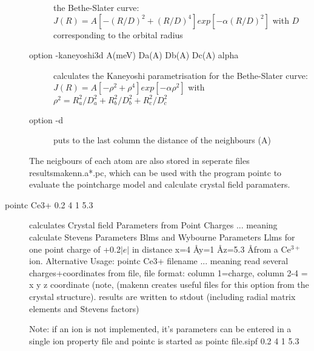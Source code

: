 \begin{description}
\begin{description}
the Bethe-Slater
                               curve: $J(R)= A [-(R/D)^2+(R/D)^4]exp[-\alpha (R/D)^2]$  with $D$ %
corresponding
                               to the orbital radius
\item[option {\prg -kaneyoshi3d A(meV) Da(A) Db(A) Dc(A) alpha}] calculates the Kaneyoshi %
parametrisation for the Bethe-Slater
                               curve: $J(R)= A [-\rho^2+\rho^4]exp[-\alpha \rho^2]$  with %
$\rho^2=R_a^2/D_a^2+R_b^2/D_b^2+R_c^2/D_c^2$
\item[option {\prg -d}] puts to the last column the distance of the neighbours (A)
\end{description}
The neigbours of each atom are also stored in seperate files
{\prg results\/makenn.a*.pc}, which can be used with the program {\prg pointc} to evaluate
the pointcharge model and calculate crystal field paramaters.

\item [\prg pointc\index{pointc} Ce3+ 0.2 4 1 5.3]
              calculates Crystal field Parameters from Point Charges  
                 ... meaning calculate Stevens Parameters Blms 
                                  and Wybourne Parameters Llms
                 for one point charge of +0.2$|e|$ in distance
                 x=4 \AA y=1 \AA z=5.3 \AA from a Ce$^{3+}$ ion.
                Alternative Usage: pointc Ce3+ filename
                 ... meaning read several charges+coordinates from file,
                 file format: column 1=charge, column 2-4 = x y z coordinate  (note,
				 ({\prg makenn} creates useful files for this option from the crystal %
structure).
                results are written to stdout (including radial matrix elements and Stevens %
factors)

                Note: if an ion is not implemented, it's parameters can be 
                      entered in a single ion property file and pointc is
                      started as 
                        pointc file.sipf 0.2 4 1 5.3


\end{description}
